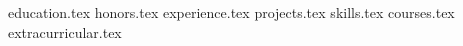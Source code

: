 \documentclass[11pt, a4paper]{awesome-cv}
\newcommand*{\sectiondir}{resume/}
\begin{document}
\makecvheader

{education.tex}
{honors.tex}
{experience.tex}
{projects.tex}
{skills.tex}
{courses.tex}
{extracurricular.tex}
\end{document}
